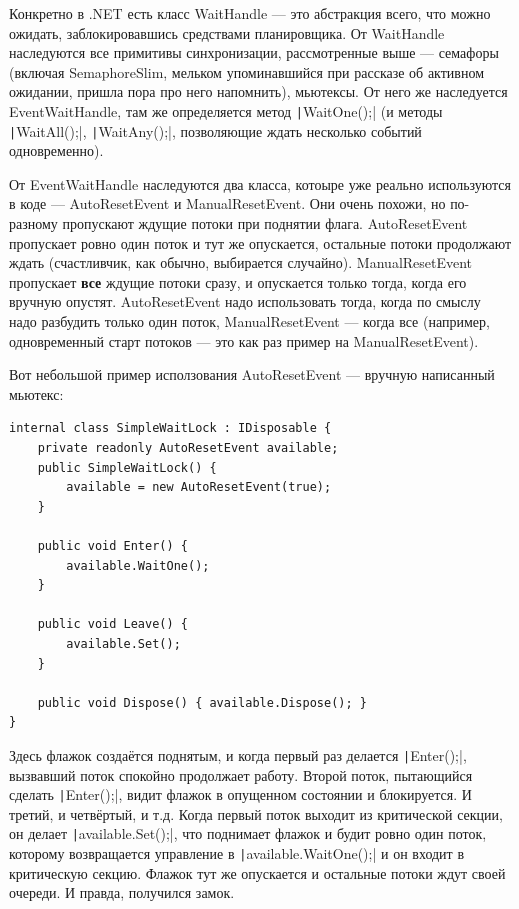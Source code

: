 \documentclass[a5paper]{article}
\begin{document}
Конкретно в .NET есть класс WaitHandle --- это абстракция всего, что можно ожидать, заблокировавшись средствами планировщика. От WaitHandle наследуются все примитивы синхронизации, рассмотренные выше --- семафоры (включая SemaphoreSlim, мельком упоминавшийся при рассказе об активном ожидании, пришла пора про него напомнить), мьютексы. От него же наследуется EventWaitHandle, там же определяется метод \texttt|WaitOne();| (и методы \texttt|WaitAll();|, \texttt|WaitAny();|, позволяющие ждать несколько событий одновременно).

От EventWaitHandle наследуются два класса, котоыре уже реально используются в коде --- AutoResetEvent и ManualResetEvent. Они очень похожи, но по-разному пропускают ждущие потоки при поднятии флага. AutoResetEvent пропускает ровно один поток и тут же опускается, остальные потоки продолжают ждать (счастливчик, как обычно, выбирается случайно). ManualResetEvent пропускает \textbf{все} ждущие потоки сразу, и опускается только тогда, когда его вручную опустят. AutoResetEvent надо использовать тогда, когда по смыслу надо разбудить только один поток, ManualResetEvent --- когда все  (например, одновременный старт потоков --- это как раз пример на ManualResetEvent).

Вот небольшой пример исползования AutoResetEvent --- вручную написанный мьютекс:

\begin{verbatim}
internal class SimpleWaitLock : IDisposable {
    private readonly AutoResetEvent available;
    public SimpleWaitLock() {
        available = new AutoResetEvent(true); 
    }

    public void Enter() {
        available.WaitOne();
    }

    public void Leave() {
        available.Set();
    }

    public void Dispose() { available.Dispose(); }
}
\end{verbatim}

Здесь флажок создаётся поднятым, и когда первый раз делается \texttt|Enter();|, вызвавший поток спокойно продолжает работу. Второй поток, пытающийся сделать \texttt|Enter();|, видит флажок в опущенном состоянии и блокируется. И третий, и четвёртый, и т.д. Когда первый поток выходит из критической секции, он делает \texttt|available.Set();|, что поднимает флажок и будит ровно один поток, которому возвращается управление в \texttt|available.WaitOne();| и он входит в критическую секцию. Флажок тут же опускается и остальные потоки ждут своей очереди. И правда, получился замок. 
\end{document}
